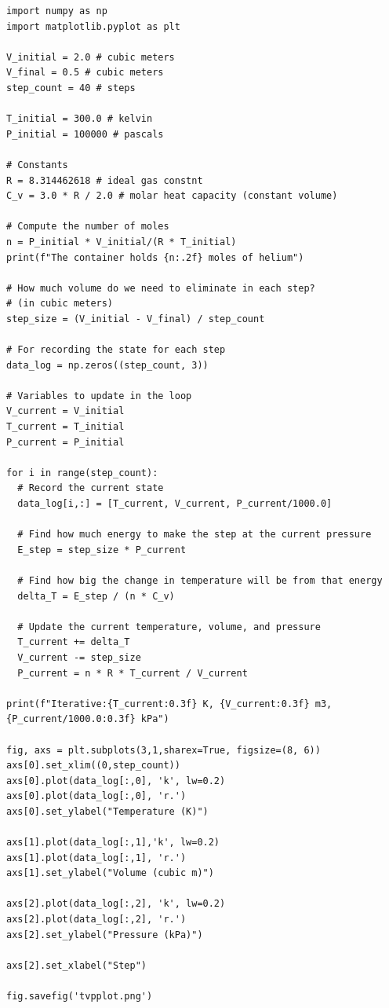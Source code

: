 \begin{Verbatim}
import numpy as np
import matplotlib.pyplot as plt

V_initial = 2.0 # cubic meters
V_final = 0.5 # cubic meters
step_count = 40 # steps

T_initial = 300.0 # kelvin
P_initial = 100000 # pascals

# Constants
R = 8.314462618 # ideal gas constnt
C_v = 3.0 * R / 2.0 # molar heat capacity (constant volume)

# Compute the number of moles
n = P_initial * V_initial/(R * T_initial) 
print(f"The container holds {n:.2f} moles of helium")

# How much volume do we need to eliminate in each step? 
# (in cubic meters)
step_size = (V_initial - V_final) / step_count

# For recording the state for each step
data_log = np.zeros((step_count, 3))

# Variables to update in the loop
V_current = V_initial
T_current = T_initial
P_current = P_initial

for i in range(step_count):
  # Record the current state
  data_log[i,:] = [T_current, V_current, P_current/1000.0]

  # Find how much energy to make the step at the current pressure
  E_step = step_size * P_current

  # Find how big the change in temperature will be from that energy
  delta_T = E_step / (n * C_v)

  # Update the current temperature, volume, and pressure
  T_current += delta_T
  V_current -= step_size
  P_current = n * R * T_current / V_current

print(f"Iterative:{T_current:0.3f} K, {V_current:0.3f} m3, {P_current/1000.0:0.3f} kPa")

fig, axs = plt.subplots(3,1,sharex=True, figsize=(8, 6))
axs[0].set_xlim((0,step_count))
axs[0].plot(data_log[:,0], 'k', lw=0.2)
axs[0].plot(data_log[:,0], 'r.')
axs[0].set_ylabel("Temperature (K)")

axs[1].plot(data_log[:,1],'k', lw=0.2)
axs[1].plot(data_log[:,1], 'r.')
axs[1].set_ylabel("Volume (cubic m)")

axs[2].plot(data_log[:,2], 'k', lw=0.2)
axs[2].plot(data_log[:,2], 'r.')
axs[2].set_ylabel("Pressure (kPa)")

axs[2].set_xlabel("Step")

fig.savefig('tvpplot.png')
\end{Verbatim}

